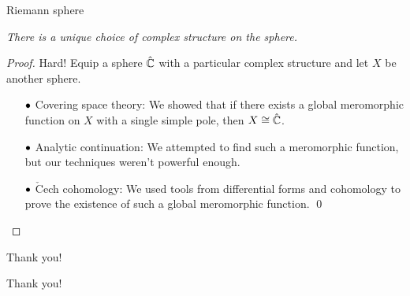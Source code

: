 \documentclass{beamer}
\begin{document}
    \begin{frame}{Riemann sphere}
        \begin{theorem}[Uniformization]
            \textit{There is a unique choice of complex structure on the sphere.}
        \end{theorem}

        \pause

        \begin{proof}
            Hard!
            \pause
            Equip a sphere $\hat{\mathbb{C}}$ with a particular complex structure and let $X$ be another sphere.
            \pause
            \begin{itemize}
                \item[\scriptsize$\bullet$] \scriptsize Covering space theory: We showed that if there exists a global meromorphic function on $X$ with a single simple pole, then $X\cong\hat{\mathbb{C}}$.
                    \pause
                \item[\scriptsize$\bullet$] \scriptsize Analytic continuation: We attempted to find such a meromorphic function, but our techniques weren't powerful enough.
                    \pause
                \item[\scriptsize$\bullet$] \scriptsize $\check{\textrm{C}}$ech cohomology: We used tools from differential forms and cohomology to prove the existence of such a global meromorphic function.
                    \pause\qed
            \end{itemize}
        \end{proof}
    \end{frame}
    \begin{frame}{Thank you!}
        \begin{center}
            Thank you!
        \end{center}
    \end{frame}
\end{document}
